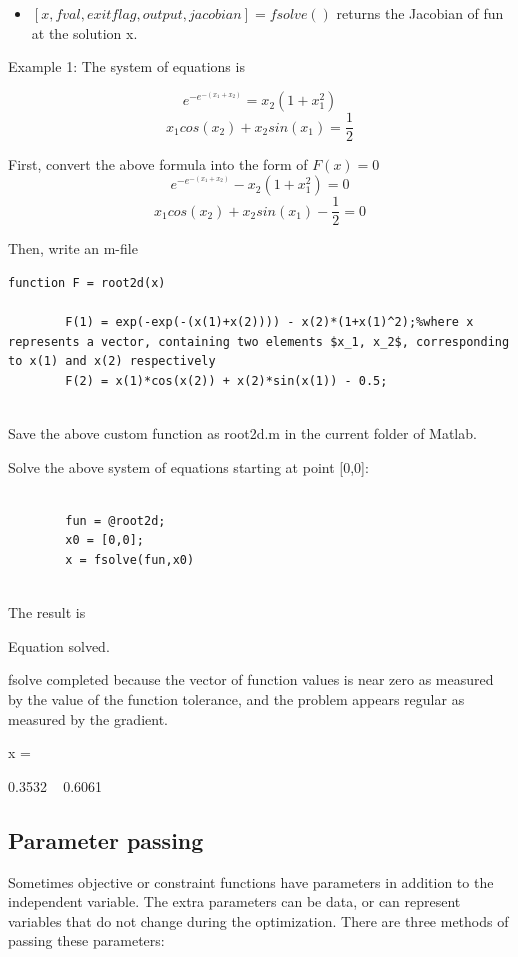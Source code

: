 \documentclass[10pt,math=newtx,citestyle=gb7714-2015,bibstyle=gb7714-2015]{elegantbook}
\begin{document}
{{{\begin{itemize}
		\item $[x,fval,exitflag,output,jacobian] = fsolve()$ returns the Jacobian of fun at the solution x.
		
		
	\end{itemize}
	
	Example 1: The system of equations is
	
	$$e^{-e^{-(x_1+x_2)}}=x_2(1+x_1^2)$$
	$$x_1cos(x_2)+x_2sin(x_1)=\frac{1}{2}$$
	
	First, convert the above formula into the form of $F(x)=0$
	$$e^{-e^{-(x_1+x_2)}}-x_2(1+x_1^2)=0$$
	$$x_1cos(x_2)+x_2sin(x_1)-\frac{1}{2}=0$$
	
	Then, write an m-file
	\begin{lstlisting}[frame=shadowbox]
		function F = root2d(x)
		
		F(1) = exp(-exp(-(x(1)+x(2)))) - x(2)*(1+x(1)^2);%where x represents a vector, containing two elements $x_1, x_2$, corresponding to x(1) and x(2) respectively
		F(2) = x(1)*cos(x(2)) + x(2)*sin(x(1)) - 0.5;
		
	\end{lstlisting}
	
	Save the above custom function as root2d.m in the current folder of Matlab.
	
	Solve the above system of equations starting at point [0,0]:
	\begin{lstlisting}[frame=shadowbox]
		
		fun = @root2d;
		x0 = [0,0];
		x = fsolve(fun,x0)
		
	\end{lstlisting}
	
	The result is
	
	Equation solved.
	
	fsolve completed because the vector of function values is near zero as measured by the value of the function tolerance, and
	the problem appears regular as measured by the gradient.
	
	
	x =
	
	0.3532  ~  0.6061
	
	\subsection{Parameter passing}
	
	Sometimes objective or constraint functions have parameters in addition to the independent variable. The extra parameters can be data, or can represent variables that do not change during the optimization. There are three methods of passing these parameters:
	
}}}
\end{document}
